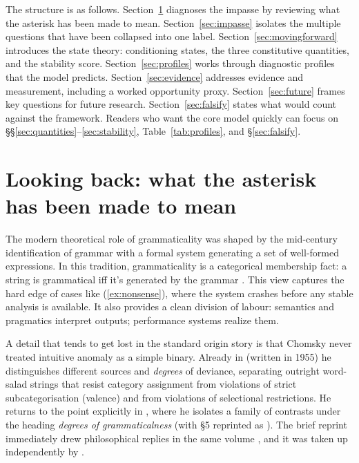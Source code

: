 \documentclass[12pt,letterpaper]{article}
\newcommand{\mention}[1]{\textit{#1}}
\begin{document}
The structure is as follows. Section~\ref{sec:lookingback} diagnoses the impasse by reviewing what the asterisk has been made to mean. Section~\ref{sec:impasse} isolates the multiple questions that have been collapsed into one label. Section~\ref{sec:movingforward} introduces the state theory: conditioning states, the three constitutive quantities, and the stability score. Section~\ref{sec:profiles} works through diagnostic profiles that the model predicts. Section~\ref{sec:evidence} addresses evidence and measurement, including a worked opportunity proxy. Section~\ref{sec:future} frames key questions for future research. Section~\ref{sec:falsify} states what would count against the framework. Readers who want the core model quickly can focus on \S\S\ref{sec:quantities}--\ref{sec:stability}, Table~\ref{tab:profiles}, and \S\ref{sec:falsify}.

\section[Looking back]{Looking back: what the asterisk has been made to mean}\label{sec:lookingback}

The modern theoretical role of grammaticality was shaped by the mid-century identification of grammar with a formal system generating a set of well-formed expressions. In this tradition, grammaticality is a categorical membership fact: a string is grammatical iff it's generated by the grammar \autocite{chomsky1957}. This view captures the hard edge of cases like (\ref{ex:nonsense}), where the system crashes before any stable analysis is available. It also provides a clean division of labour: semantics and pragmatics interpret outputs; performance systems realize them.

A detail that tends to get lost in the standard origin story is that Chomsky never treated intuitive anomaly as a simple binary. Already in \textcite{chomsky1975lslt} (written in 1955) he distinguishes different sources and \emph{degrees} of deviance, separating outright word-salad strings that resist category assignment from violations of strict subcategorisation (valence) and from violations of selectional restrictions. He returns to the point explicitly in \textcite{chomsky1961methodological}, where he isolates a family of contrasts under the heading \mention{degrees of grammaticalness} (with \S5 reprinted as \textcite[384--389]{chomsky1964degrees}). The brief reprint immediately drew philosophical replies in the same volume \autocite[390--399]{ziff1964understanding, katz1964semi}, and it was taken up independently by \textcite{cohen1965degree}.
\end{document}
